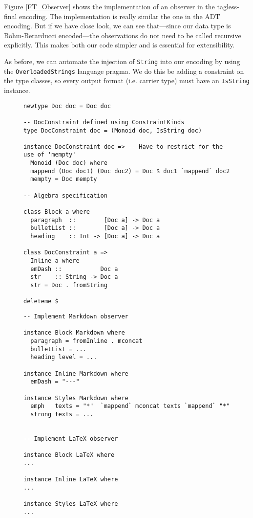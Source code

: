 Figure \ref{FT_Observer} shows the implementation of an observer in the
tagless-final encoding. The implementation is really similar the one in the ADT
encoding. But if we have close look, we can see that—since our data type is
Böhm-Berarducci encoded—the observations do not need to be called recursive
explicitly. This makes both our code simpler and is essential for extensibility.

As before, we can automate the injection of \texttt{String} into our encoding by
using the \texttt{OverloadedStrings} language pragma. We do this be adding a
constraint on the type classes, so every output format (i.e. carrier type) must
have an \texttt{IsString} instance.

\begin{figure}
\begin{lstlisting}
newtype Doc doc = Doc doc

-- DocConstraint defined using ConstraintKinds
type DocConstraint doc = (Monoid doc, IsString doc)

instance DocConstraint doc => -- Have to restrict for the use of 'mempty'
  Monoid (Doc doc) where
  mappend (Doc doc1) (Doc doc2) = Doc $ doc1 `mappend` doc2
  mempty = Doc mempty

-- Algebra specification

class Block a where
  paragraph  ::        [Doc a] -> Doc a
  bulletList ::        [Doc a] -> Doc a
  heading    :: Int -> [Doc a] -> Doc a

class DocConstraint a =>
  Inline a where
  emDash ::           Doc a
  str    :: String -> Doc a
  str = Doc . fromString

deleteme $
\end{lstlisting}
\end{figure}

\begin{figure}
\begin{lstlisting}
-- Implement Markdown observer

instance Block Markdown where
  paragraph = fromInline . mconcat
  bulletList = ...
  heading level = ...

instance Inline Markdown where
  emDash = "---"

instance Styles Markdown where
  emph   texts = "*"  `mappend` mconcat texts `mappend` "*"
  strong texts = ...


-- Implement LaTeX observer

instance Block LaTeX where
...

instance Inline LaTeX where
...

instance Styles LaTeX where
...
\end{lstlisting}
\end{figure}




